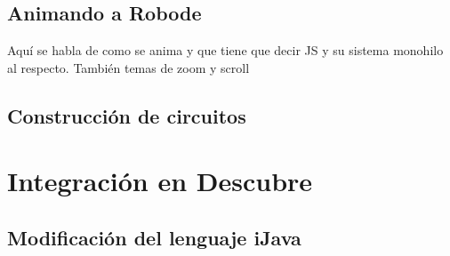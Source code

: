 \subsection{Animando a Robode}
\label{animando-robode}

Aquí se habla de como se anima y que tiene que decir JS y su sistema monohilo al respecto. También temas de zoom y scroll



\subsection{Construcción de circuitos}
\label{sec:construccion-circuitos}






\section{Integración en Descubre}
\label{sec:integracion-descubre}

\subsection{Modificación del lenguaje iJava}
\label{sec:modificacion-ijava}


